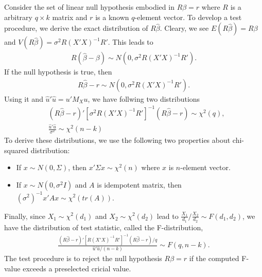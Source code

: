 \documentclass[
  12pt,
]{article}
\providecommand{\tightlist}{%
  \setlength{\itemsep}{0pt}\setlength{\parskip}{0pt}}
\begin{document}
Consider the set of linear null hypothesis embodied in \(R \beta = r\)
where \(R\) is a arbitrary \(q \times k\) matrix and \(r\) is a known
\(q\)-element vector. To develop a test procedure, we derive the exact
distribution of \(R\hat{\beta}\). Cleary, we see
\(E(R\hat{\beta}) = R\beta\) and
\(V(R\hat{\beta}) = \sigma^2 R (X'X)^{-1} R'\). This leads to
\begin{align*}
  R(\hat{\beta} - \beta) \sim N(0, \sigma^2 R (X'X)^{-1} R').
\end{align*} If the null hypothesis is true, then \begin{align*}
  R\hat{\beta} - r \sim N(0, \sigma^2 R (X'X)^{-1} R').
\end{align*} Using it and \(\hat{u}'\hat{u} = u' M_X u\), we have
follwing two distributions \begin{align*}
  &(R\hat{\beta} - r)'[\sigma^2 R (X'X)^{-1} R']^{-1}(R\hat{\beta} - r) \sim \chi^2(q),  \\
  &\frac{\hat{u}'\hat{u}}{\sigma^2} \sim \chi^2(n - k)
\end{align*} To derive these distributions, we use the following two
properties about chi-squared distribution:

\begin{itemize}
\tightlist
\item
  If \(x \sim N(0, \Sigma)\), then \(x'\Sigma x \sim \chi^2(n)\) where
  \(x\) is \(n\)-element vector.
\item
  If \(x \sim N(0, \sigma^2 I)\) and \(A\) is idempotent matrix, then
  \((\sigma^2)^{-1} x'Ax \sim \chi^2(tr(A))\).
\end{itemize}

Finally, since \(X_1 \sim \chi^2(d_1)\) and \(X_2 \sim \chi^2(d_2)\)
lead to \(\frac{X_1}{d_1}/\frac{X_2}{d_2} \sim F(d_1, d_2)\), we have
the distribution of test statistic, called the F-distribution,
\begin{align*}
  \frac{(R\hat{\beta} - r)'[R (X'X)^{-1} R']^{-1}(R\hat{\beta} - r)/q}{\hat{u}'\hat{u}/(n - k)} \sim F(q, n-k).
\end{align*} The test procedure is to reject the null hypothesis
\(R\beta = r\) if the computed F-value exceeds a preselected cricial
value.
\end{document}
